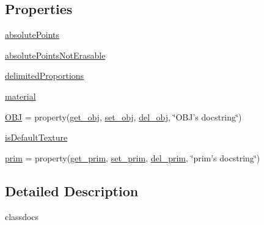 \subsection*{Properties}
\begin{DoxyCompactItemize}
\item 
\hyperlink{classdestruction_1_1_texture_1_1_texture_a2a9be26626847923d0978eb84d2d58d8}{absolute\-Points}
\item 
\hyperlink{classdestruction_1_1_texture_1_1_texture_a246ec1debed3d8e77e1db7072a416e22}{absolute\-Points\-Not\-Erasable}
\item 
\hyperlink{classdestruction_1_1_texture_1_1_texture_a216a10063bec9f7e0ef98be8ffb51a9e}{delimited\-Proportions}
\item 
\hyperlink{classdestruction_1_1_texture_1_1_texture_a4b3342c3c281c49eeb86276397d45659}{material}
\item 
\hyperlink{classdestruction_1_1_texture_1_1_texture_a430df2978ed649f6b9af6c458a86951f}{O\-B\-J} = property(\hyperlink{classdestruction_1_1_texture_1_1_texture_a99100bbc8124a1d3c1cf4cdfb13bf9f9}{get\-\_\-obj}, \hyperlink{classdestruction_1_1_texture_1_1_texture_a299b61efde6c752614771dc4d508dad8}{set\-\_\-obj}, \hyperlink{classdestruction_1_1_texture_1_1_texture_adf7795e15e4f77f564e163f787bfdb04}{del\-\_\-obj}, \char`\"{}O\-B\-J's docstring\char`\"{})
\item 
\hyperlink{classdestruction_1_1_texture_1_1_texture_a214cb8653c99c7aa1df9d41d09de7009}{is\-Default\-Texture}
\item 
\hyperlink{classdestruction_1_1_texture_1_1_texture_a5647247acd4010e891e5a0526d1a9fd5}{prim} = property(\hyperlink{classdestruction_1_1_texture_1_1_texture_a3ac7ab3a49f842f04b6866b5f5a165e8}{get\-\_\-prim}, \hyperlink{classdestruction_1_1_texture_1_1_texture_adbb27365cab90eefb5018b926600f231}{set\-\_\-prim}, \hyperlink{classdestruction_1_1_texture_1_1_texture_a74d8db55624f2386c3b2eecfa35cb12c}{del\-\_\-prim}, \char`\"{}prim's docstring\char`\"{})
\end{DoxyCompactItemize}


\subsection{Detailed Description}
\begin{DoxyVerb}classdocs
\end{DoxyVerb}
 


